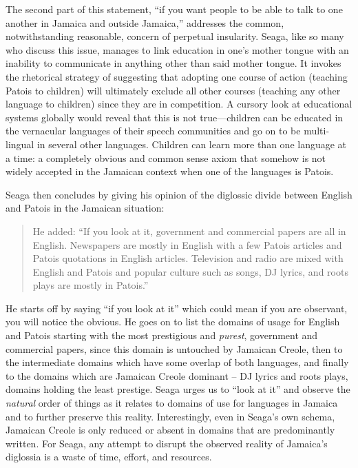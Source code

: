 \documentclass[output=paper,colorlinks,citecolor=brown]{langscibook}
\begin{document}
The second part of this statement, “if you want people to be able to talk to one another in Jamaica and outside Jamaica,” addresses the common, notwithstanding reasonable, concern of perpetual insularity. Seaga, like so many who discuss this issue, manages to link education in one’s mother tongue with an inability to communicate in anything other than said mother tongue. It invokes the rhetorical strategy of suggesting that adopting one course of action (teaching Patois to children) will ultimately exclude all other courses (teaching any other language to children) since they are in competition. A cursory look at educational systems globally would reveal that this is not true—children can be educated in the vernacular languages of their speech communities and go on to be multi-lingual in several other languages. Children can learn more than one language at a time: a completely obvious and common sense axiom that somehow is not widely accepted in the Jamaican context when one of the languages is Patois. 

Seaga then concludes by giving his opinion of the diglossic divide between English and Patois in the Jamaican situation: 

\begin{quote}
    He added: “If you look at it, government and commercial papers are all in English. Newspapers are mostly in English with a few Patois articles and Patois quotations in English articles. Television and radio are mixed with English and Patois and popular culture such as songs, DJ lyrics, and roots plays are mostly in Patois.” 
\end{quote}


He starts off by saying “if you look at it” which could mean if you are observant, you will notice the obvious. He goes on to list the domains of usage for English and Patois starting with the most prestigious and \emph{purest}, government and commercial papers, since this domain is untouched by Jamaican Creole, then to the intermediate domains which have some overlap of both languages, and finally to the domains which are Jamaican Creole dominant -- DJ lyrics and roots plays, domains holding the least prestige. Seaga urges us to “look at it” and observe the \emph{natural} order of things as it relates to domains of use for languages in Jamaica and to further preserve this reality. Interestingly, even in Seaga’s own schema, Jamaican Creole is only reduced or absent in domains that are predominantly written. For Seaga, any attempt to disrupt the observed reality of Jamaica’s diglossia is a waste of time, effort, and resources. 
\end{document}
